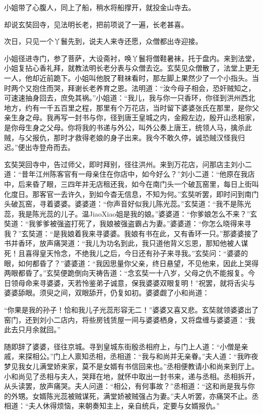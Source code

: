 \documentclass[12pt,UTF8]{ctexbook}
\begin{document}
{	小姐带了心腹人，同上了船，稍水将船撑开，就投金山寺去。
	
	却说玄奘回寺，见法明长老，把前项说了一遍，长老甚喜。
	
	次日，只见一个丫鬟先到，说夫人来寺还愿，众僧都出寺迎接。
	
	小姐径进寺门，参了菩萨，大设斋衬，唤丫鬟将僧鞋暑袜，托于盘内。来到法堂，小姐复拈心香礼拜，就教法明长老分表与众僧去讫。玄奘见众僧散了，法堂上更无一人，他却近前跪下。小姐叫他脱了鞋袜看时，那左脚上果然少了一个小指头。当时两个又抱住而哭，拜谢长老养育之恩。法明道：“汝今母子相会，恐奸贼知之，可速速抽身回去，庶免其祸。”小姐道：“我儿，我与你一只香环，你径到洪州西北地方，约有一千五百里之程，那里有个万花店，当时留下婆婆张氏在那里，是你父亲生身之母。我再写一封书与你，径到唐王皇城之内，金殿左边，殷开山丞相家，是你母生身之父母。你将我的书递与外公，叫外公奏上唐王，统领人马，擒杀此贼，与父报仇，那时才救得老娘的身子出来。我今不敢久停，诚恐贼汉怪我归迟。”便出寺登舟而去。
	
	玄奘哭回寺中，告过师父，即时拜别，径往洪州。来到万花店，问那店主刘小二道：“昔年江州陈客官有一母亲住在你店中，如今好么？”刘小二道：“他原在我店中，后来昏了眼，三四年并无店租还我，如今在南门头一个破瓦窑里，每日上街叫化度日。那客官一去许久，到如今杳无信息，不知为何。”玄奘听罢，即时问到南门头破瓦窑，寻着婆婆。婆婆道：“你声音好似我儿陈光蕊。”玄奘道：“我不是陈光蕊，我是陈光蕊的儿子。温JiaoXiao姐是我的娘。”婆婆道：“你爹娘怎么不来？”玄奘道：“我爹爹被强盗打死了，我娘被强盗霸占为妻。”婆婆道：“你怎么晓得来寻我？”玄奘道：“是我娘着我来寻婆婆。我娘有书在此，又有香环一只。”那婆婆接了书并香环，放声痛哭道：“我儿为功名到此，我只道他背义忘恩，那知他被人谋死！且喜得皇天怜念，不绝我儿之后，今日还有孙子来寻我。”玄奘问：“婆婆的眼，如何都昏了？”婆婆道：“我因思量你父亲，终日悬望，不见他来，因此上哭得两眼都昏了。”玄奘便跪倒向天祷告道：“念玄奘一十八岁，父母之仇不能报复。今日领母命来寻婆婆，天若怜鉴弟子诚意，保我婆婆双眼复明！”祝罢，就将舌尖与婆婆舔眼。须臾之间，双眼舔开，仍复如初。婆婆觑了小和尚道：
	
	“你果是我的孙子！恰和我儿子光蕊形容无二！”婆婆又喜又悲。玄奘就领婆婆出了窑门，还到刘小二店内，将些房钱赁屋一间与婆婆栖身，又将盘缠与婆婆道：“我此去只月余就回。”
	
	随即辞了婆婆，径往京城。寻到皇城东街殷丞相府上，与门上人道：“小僧是亲戚，来探相公。”门上人禀知丞相，丞相道：“我与和尚并无亲眷。”夫人道：“我昨夜梦见我女儿满堂娇来家，莫不是女婿有书信回来也。”丞相便教请小和尚来到厅上。小和尚见了丞相与夫人，哭拜在地，就怀中取出一封书来，递与丞相。丞相拆开，从头读罢，放声痛哭。夫人问道：“相公，有何事故？”丞相道：“这和尚是我与你的外甥。女婿陈光蕊被贼谋死，满堂娇被贼强占为妻。”夫人听罢，亦痛哭不止。丞相道：“夫人休得烦恼，来朝奏知主上，亲自统兵，定要与女婿报仇。”
	
}
\end{document}
